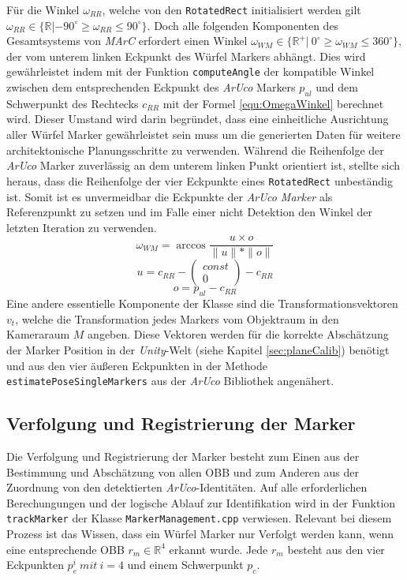 Für die Winkel $\omega_{RR}$, welche von den \texttt{RotatedRect} initialisiert werden gilt $\omega_{RR} \in \{\mathbb{R} | -90^\circ \ge \omega_{RR} \le 90^\circ\}$. Doch alle folgenden Komponenten des Gesamtsystems von \textit{MArC} erfordert einen Winkel $\omega_{WM} \in \{\mathbb{R}^+ |\ 0 ^\circ \ge \omega_{WM} \le 360^\circ\}$, der vom unterem linken Eckpunkt des Würfel Markers abhängt. Dies wird gewährleistet indem mit der Funktion \texttt{computeAngle} der kompatible Winkel zwischen dem entsprechenden Eckpunkt des \textit{ArUco} Markers $p_{ul}$ und dem Schwerpunkt des Rechtecks $c_{RR}$ mit der Formel \ref{equ:OmegaWinkel} berechnet wird. Dieser Umstand wird darin begründet, dass eine einheitliche Ausrichtung aller Würfel Marker gewährleistet sein muss um die generierten Daten für weitere architektonische Planungsschritte zu verwenden. Während die Reihenfolge der \textit{ArUco} Marker zuverlässig an dem unterem linken Punkt orientiert ist, stellte sich heraus, dass die Reihenfolge der vier Eckpunkte eines \texttt{RotatedRect} unbeständig ist. Somit ist es unvermeidbar die Eckpunkte der \textit{ ArUco Marker} als Referenzpunkt zu setzen und im Falle einer nicht Detektion den Winkel der letzten Iteration zu verwenden. 
\begin{equation}
\label{equ:OmegaWinkel}
\omega_{WM} = \arccos \frac{u \times o}{\|u\|*\|o\|} 
\end{equation}
\begin{equation}
u = c_{RR} - \begin{pmatrix}
const\\ 0
\end{pmatrix}  -c_{RR}
\end{equation}
\begin{equation}
o=p_{ul}-c_{RR}
\end{equation}
Eine andere essentielle Komponente der Klasse sind die Transformationsvektoren $v_t$, welche die Transformation jedes Markers vom Objektraum in den Kameraraum $M$ angeben. Diese Vektoren werden für die korrekte Abschätzung der Marker Position in der \textit{Unity}-Welt (siehe Kapitel \ref{sec:planeCalib}) benötigt und aus den vier äußeren Eckpunkten in der Methode \texttt{estimatePoseSingleMarkers} aus der \textit{ArUco} Bibliothek angenähert. 

\subsection{Verfolgung und Registrierung der Marker}
Die Verfolgung und Registrierung der Marker besteht zum Einen aus der Bestimmung und Abschätzung von allen OBB und zum Anderen aus der Zuordnung von den detektierten \textit{ArUco}-Identitäten. Auf alle erforderlichen Berechungungen und der logische Ablauf zur Identifikation wird in der Funktion \texttt{trackMarker} der Klasse \texttt{MarkerManagement.cpp} verwiesen. Relevant bei diesem Prozess ist das Wissen, dass ein Würfel Marker nur Verfolgt werden kann, wenn eine entsprechende OBB $r_m \in \mathbb{R}^4$ erkannt wurde. Jede $r_m$ besteht aus den vier Eckpunkten $p_e^i \ mit \ i=4$ und einem Schwerpunkt $p_c$.

